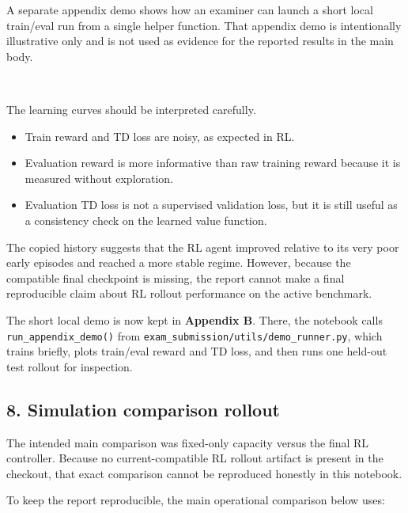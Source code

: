 \documentclass[11pt]{article}
\providecommand{\tightlist}{%
      \setlength{\itemsep}{0pt}\setlength{\parskip}{0pt}}
\begin{document}
A separate appendix demo shows how an examiner can launch a short local
train/eval run from a single helper function. That appendix demo is
intentionally illustrative only and is not used as evidence for the
reported results in the main body.

    \begin{center}
    \end{center}
    { \hspace*{\fill} \\}
    
    The learning curves should be interpreted carefully.

\begin{itemize}
\tightlist
\item
  Train reward and TD loss are noisy, as expected in RL.
\item
  Evaluation reward is more informative than raw training reward because
  it is measured without exploration.
\item
  Evaluation TD loss is not a supervised validation loss, but it is
  still useful as a consistency check on the learned value function.
\end{itemize}

The copied history suggests that the RL agent improved relative to its
very poor early episodes and reached a more stable regime. However,
because the compatible final checkpoint is missing, the report cannot
make a final reproducible claim about RL rollout performance on the
active benchmark.

    The short local demo is now kept in \textbf{Appendix B}. There, the
notebook calls \texttt{run\_appendix\_demo()} from
\texttt{exam\_submission/utils/demo\_runner.py}, which trains briefly,
plots train/eval reward and TD loss, and then runs one held-out test
rollout for inspection.

    \subsection{8. Simulation comparison
rollout}\label{simulation-comparison-rollout}

The intended main comparison was fixed-only capacity versus the final RL
controller. Because no current-compatible RL rollout artifact is present
in the checkout, that exact comparison cannot be reproduced honestly in
this notebook.

To keep the report reproducible, the main operational comparison below
uses:
\end{document}
